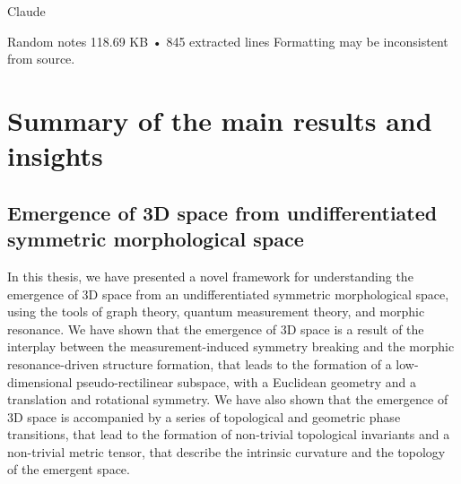 Claude

Random notes
118.69 KB • 845 extracted lines
Formatting may be inconsistent from source.

\newcommand{\AUTHOR}{Jacob Valdez and  Claude Opus}
\newcommand{\CLIENT}{Client Name}
\newcommand{\DATE}{4 April 2024}
\newcommand{\VERSION}{0.0.1}
\newcommand{\TITLE}{The Morphic Resonant Universe}
\newcommand{\SUBTITLE}{The Emergence of 3D Space from Undifferentiated Symmetric Morphological Space: A Graph-Theoretic Approach}
\newcommand{\SUBJECT}{Metaphysics}
\newcommand{\URL}{x.com/jvboid}


\section{Summary of the main results and insights}
\subsection{Emergence of 3D space from undifferentiated symmetric morphological space}
In this thesis, we have presented a novel framework for understanding the emergence of 3D space from an undifferentiated symmetric morphological space, using the tools of graph theory, quantum measurement theory, and morphic resonance. We have shown that the emergence of 3D space is a result of the interplay between the measurement-induced symmetry breaking and the morphic resonance-driven structure formation, that leads to the formation of a low-dimensional pseudo-rectilinear subspace, with a Euclidean geometry and a translation and rotational symmetry. We have also shown that the emergence of 3D space is accompanied by a series of topological and geometric phase transitions, that lead to the formation of non-trivial topological invariants and a non-trivial metric tensor, that describe the intrinsic curvature and the topology of the emergent space.

